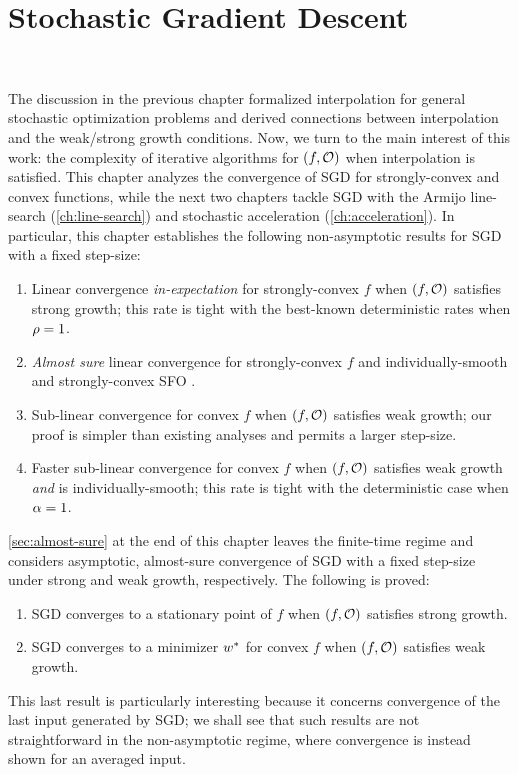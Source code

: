 
\chapter{Stochastic Gradient Descent}~\label{ch:sgd}

The discussion in the previous chapter formalized interpolation for general stochastic optimization problems and derived connections between interpolation and the weak/strong growth conditions.  
Now, we turn to the main interest of this work: the complexity of iterative algorithms for \( \rbr{f, \oracle{}} \) when interpolation is satisfied. 
This chapter analyzes the convergence of \ac{SGD} for strongly-convex and convex functions, while the next two chapters tackle \ac{SGD} with the Armijo line-search (\autoref{ch:line-search}) and stochastic acceleration (\autoref{ch:acceleration}).
In particular, this chapter establishes the following non-asymptotic results for \ac{SGD} with a fixed step-size: 
\begin{enumerate}
    \item Linear convergence \emph{in-expectation} for strongly-convex \( f \) when \( \rbr{f, \oracle{}} \) satisfies strong growth; this rate is tight with the best-known deterministic rates when \( \sgc = 1 \).
    \item \emph{Almost sure} linear convergence for strongly-convex \( f \) and individually-smooth and strongly-convex \ac{SFO} \oracle{}. 
    \item Sub-linear convergence for convex \( f \) when \( \rbr{f, \oracle{}} \) satisfies weak growth; our proof is simpler than existing analyses and permits a larger step-size.
    \item Faster sub-linear convergence for convex \( f \) when \( \rbr{f, \oracle{}} \) satisfies weak growth \emph{and} \oracle{} is individually-smooth; this rate is tight with the deterministic case when \( \wgc = 1 \).
\end{enumerate}
\autoref{sec:almost-sure} at the end of this chapter leaves the finite-time regime and considers asymptotic, almost-sure convergence of \ac{SGD} with a fixed step-size under strong and weak growth, respectively.
The following is proved: 
\begin{enumerate}
    \item \ac{SGD} converges to a stationary point of \( f \) when \( \rbr{f, \oracle{}} \) satisfies strong growth.
    \item \ac{SGD} converges to a minimizer \( \wopt \) for convex \( f \) when \( \rbr{f, \oracle{}} \) satisfies weak growth.
\end{enumerate}
This last result is particularly interesting because it concerns convergence of the last input generated by \ac{SGD};
we shall see that such results are not straightforward in the non-asymptotic regime, where convergence is instead shown for an averaged input. 

